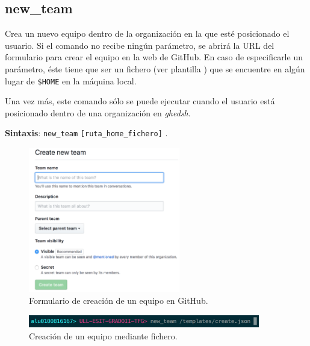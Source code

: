 \subsection{new\_team}
\label{3.3.12}

Crea un nuevo equipo dentro de la organización en la que esté posicionado el usuario. Si el comando no recibe ningún parámetro, se abrirá la URL del formulario para crear el equipo en la web de GitHub. En caso de especificarle un parámetro,
éste tiene que ser un fichero (ver plantilla \cite{B25}) que se encuentre en algún lugar de \verb|$HOME| en la máquina local.

Una vez más, este comando sólo se puede ejecutar cuando el usuario está posicionado dentro de una organización en {\it ghedsh}.

\textbf{Sintaxis}: \verb|new_team| \verb|[ruta_home_fichero]| .

\begin{figure}[H]
	\begin{center}
	\includegraphics[width=0.59\textwidth]{images/create-team-form.png}
	\caption{Formulario de creación de un equipo en GitHub.}
	\label{fig:create-team-form}
	\end{center}
\end{figure}

\begin{figure}[H]
	\begin{center}
	\includegraphics[width=0.9\textwidth]{images/create-team-file.png}
	\caption{Creación de un equipo mediante fichero.}
	\label{fig:create-team-file}
	\end{center}
\end{figure}

